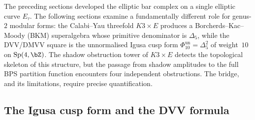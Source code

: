 The preceding sections developed the elliptic bar complex on a
single elliptic curve $E_\tau$. The following sections examine a fundamentally
different role for genus-$2$ modular forms: the Calabi--Yau
threefold $K3 \times E$ produces a Borcherds--Kac--Moody (BKM)
superalgebra whose primitive denominator is \(\Delta_5\), while the
DVV/DMVV square is the unnormalised Igusa cusp form
\(\Phi_{10}^{\mathrm{un}}=\Delta_5^2\) of weight~$10$ on
\(\operatorname{Sp}(4, \bZ)\). The shadow obstruction tower
of $K3 \times E$ detects the topological skeleton of this
structure, but the passage from shadow amplitudes to the full
BPS partition function encounters four independent obstructions.
The bridge, and its limitations, require precise quantification.

\subsection{The Igusa cusp form and the DVV formula}
\label{subsec:igusa-dvv}

